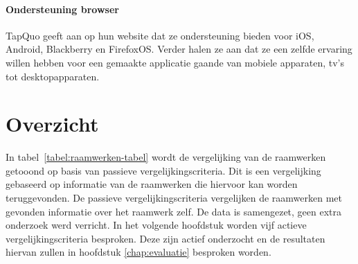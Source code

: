 \paragraph{Ondersteuning browser}
TapQuo geeft aan op hun website dat ze ondersteuning bieden voor iOS, Android, Blackberry en FirefoxOS.
Verder halen ze aan dat ze een zelfde ervaring willen hebben voor een gemaakte applicatie gaande van mobiele apparaten, tv's tot desktopapparaten.


\section{Overzicht}
\label{sec:raamwerken-tabel}


In tabel~\ref{tabel:raamwerken-tabel} wordt de vergelijking van de raamwerken getooond op basis van passieve vergelijkingscriteria.
Dit is een vergelijking gebaseerd op informatie van de raamwerken die hiervoor kan worden teruggevonden.
De passieve vergelijkingscriteria vergelijken de raamwerken met gevonden informatie over het raamwerk zelf.
De data is samengezet,  geen extra onderzoek werd verricht.
In het volgende hoofdstuk worden vijf actieve vergelijkingscriteria besproken.
Deze zijn actief onderzocht en de resultaten hiervan zullen in hoofdstuk \ref{chap:evaluatie} besproken worden.

\begin{landscape}
\begin{table}[H]
\centering
{}
\caption{Samenvattende tabel voor passieve vergelijkingscriteria van mobiele HTML5-raamwerken}
\label{tabel:raamwerken-tabel}
\end{table}
\end{landscape}
